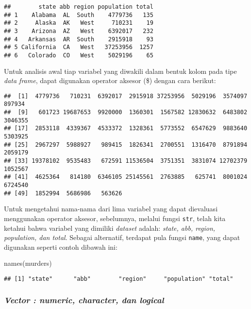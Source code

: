 \documentclass[
]{article}
\newenvironment{Shaded}{\begin{snugshade}}{\end{snugshade}}
\newcommand{\FunctionTok}[1]{\textcolor[rgb]{0.00,0.00,0.00}{#1}}
\newcommand{\NormalTok}[1]{#1}
\newcommand{\SpecialCharTok}[1]{\textcolor[rgb]{0.00,0.00,0.00}{#1}}
\begin{document}
\begin{verbatim}
##        state abb region population total
## 1    Alabama  AL  South    4779736   135
## 2     Alaska  AK   West     710231    19
## 3    Arizona  AZ   West    6392017   232
## 4   Arkansas  AR  South    2915918    93
## 5 California  CA   West   37253956  1257
## 6   Colorado  CO   West    5029196    65
\end{verbatim}

Untuk analisis awal tiap variabel yang diwakili dalam bentuk kolom pada
tipe \emph{data frame}, dapat digunakan operator aksesor (\$) dengan
cara berikut:

\begin{Shaded}
\end{Shaded}

\begin{verbatim}
##  [1]  4779736   710231  6392017  2915918 37253956  5029196  3574097   897934
##  [9]   601723 19687653  9920000  1360301  1567582 12830632  6483802  3046355
## [17]  2853118  4339367  4533372  1328361  5773552  6547629  9883640  5303925
## [25]  2967297  5988927   989415  1826341  2700551  1316470  8791894  2059179
## [33] 19378102  9535483   672591 11536504  3751351  3831074 12702379  1052567
## [41]  4625364   814180  6346105 25145561  2763885   625741  8001024  6724540
## [49]  1852994  5686986   563626
\end{verbatim}

Untuk mengetahui nama-nama dari lima variabel yang dapat dievaluasi
menggunakan operator aksesor, sebelumnya, melalui fungsi \texttt{str},
telah kita ketahui bahwa variabel yang dimiliki \emph{dataset} adalah:
\emph{state, abb, region, population, dan total}. Sebagai alternatif,
terdapat pula fungsi \texttt{name}, yang dapat digunakan seperti contoh
dibawah ini:

\begin{Shaded}
\begin{Highlighting}[]
\FunctionTok{names}\NormalTok{(murders)}
\end{Highlighting}
\end{Shaded}

\begin{verbatim}
## [1] "state"      "abb"        "region"     "population" "total"
\end{verbatim}

\hypertarget{vector-numeric-character-dan-logical}{%
\subsubsection{\texorpdfstring{\emph{Vector : numeric, character, dan
logical}}{Vector : numeric, character, dan logical}}\label{vector-numeric-character-dan-logical}}
\end{document}
